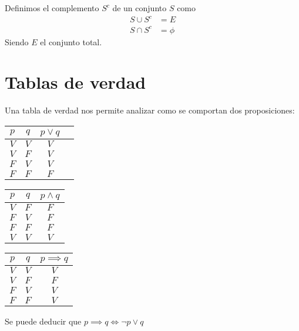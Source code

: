 \documentclass{article}
\begin{document}
\begin{defin}
	Definimos el complemento $S^{c}$ de un conjunto $S$ como
	\begin{equation}
		\begin{split}
			S \cup S^{c} &= E\\
			S \cap S^{c} &= \phi
		\end{split}
	\end{equation}
	Siendo $E$ el conjunto total. 
\end{defin}
\section{Tablas de verdad}
Una tabla de verdad nos permite analizar como se comportan dos proposiciones:
\begin{table}[h]
	\centering

	\begin{tabular}{c|c|c|c}
		$p$ & $q$ & $p\vee q$\\
		\hline
		$V$ & $V$ & $V$\\
		$V$ & $F$ & $V$\\
		$F$ & $V$ & $V$\\
		$F$ & $F$ & $F$\\  
	\end{tabular}
\end{table}
\begin{table}[h]
	\centering

	\begin{tabular}{c|c|c}
		$p$ & $q$ & $p\wedge q$\\
		\hline
		$V$ & $F$ &$F$\\
		$F$&$V$&$F$\\
		$F$ & $F$ & $F$\\
		$V$ & $V$ & $V$
	\end{tabular}
\end{table}
\begin{table}[h]
	\centering

	\begin{tabular}{c|c|c}
		$p$ & $q$ & $p \implies q$\\
		\hline
		$V$ & $V$ & $V$\\
		$V$&$F$&$F$\\
		$F$&$V$&$V$\\
		$F$&$F$&$V$
		
	\end{tabular}
\end{table}
Se puede deducir que $p \implies q \iff \neg p \vee q$ 
\end{document}
